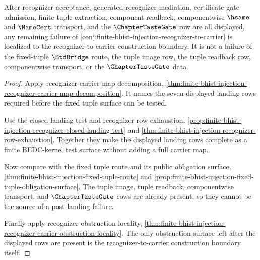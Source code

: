 \begin{theorem}
\label{thm:finite-bhist-injection-recognizer-carrier-obstruction-tightening}
After recognizer acceptance, generated-recognizer mediation, certificate-gate admission, finite tuple extraction, component readback, componentwise $\hsame$ and $\NameCert$ transport, and the $\ChapterTasteGate$ row are all displayed, any remaining failure of \autoref{conj:finite-bhist-injection-recognizer-to-carrier} is localized to the recognizer-to-carrier construction boundary. It is not a failure of the fixed-tuple $\StdBridge$ route, the tuple image row, the tuple readback row, componentwise transport, or the $\ChapterTasteGate$ data.
\end{theorem}
\begin{proof}
Apply recognizer carrier-map decomposition, \autoref{thm:finite-bhist-injection-recognizer-carrier-map-decomposition}. It names the seven displayed landing rows required before the fixed tuple surface can be tested.

Use the closed landing test and recognizer row exhaustion, \autoref{prop:finite-bhist-injection-recognizer-closed-landing-test} and \autoref{thm:finite-bhist-injection-recognizer-row-exhaustion}. Together they make the displayed landing rows complete as a finite BEDC-kernel test surface without adding a full carrier map.

Now compare with the fixed tuple route and its public obligation surface, \autoref{thm:finite-bhist-injection-fixed-tuple-route} and \autoref{prop:finite-bhist-injection-fixed-tuple-obligation-surface}. The tuple image, tuple readback, componentwise transport, and $\ChapterTasteGate$ rows are already present, so they cannot be the source of a post-landing failure.

Finally apply recognizer obstruction locality, \autoref{thm:finite-bhist-injection-recognizer-carrier-obstruction-locality}. The only obstruction surface left after the displayed rows are present is the recognizer-to-carrier construction boundary itself.
\end{proof}

